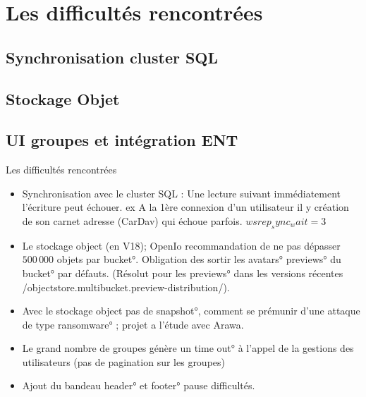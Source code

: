 
\section{Les difficultés rencontrées}
\subsection{Synchronisation cluster SQL}
\subsection{Stockage Objet}
\subsection{UI groupes et intégration ENT}
\begin{frame}[fragile]{Les difficultés rencontrées}

\begin{itemize}
	\item Synchronisation avec le cluster SQL : Une lecture suivant immédiatement l'écriture peut échouer.  
	ex A la 1ère connexion d'un utilisateur il y création de son carnet adresse (CarDav) qui échoue parfois.
		$wsrep_sync_wait = 3$
\end{itemize}
\begin{itemize}

\item Le stockage object (en \small{V18});  OpenIo recommandation de ne pas dépasser $500\,000$ objets par \ang{bucket}. Obligation des sortir les \ang{avatars} \ang{previews} du \ang{bucket} par défauts. (Résolut pour les \ang{previews} dans les versions récentes \code/objectstore.multibucket.preview-distribution/).

\item Avec le stockage object pas de \ang{snapshot}, comment se prémunir d'une attaque de type \ang{ransomware} ; projet a l'étude avec Arawa. 

\end{itemize}


\begin{itemize}
 \item Le grand nombre de groupes génère un \ang{time out} à l'appel de la gestions des utilisateurs (pas de pagination sur les groupes)
 \item Ajout du bandeau \ang{header} et \ang{footer} pause difficultés. 
\end{itemize}

\end{frame}

